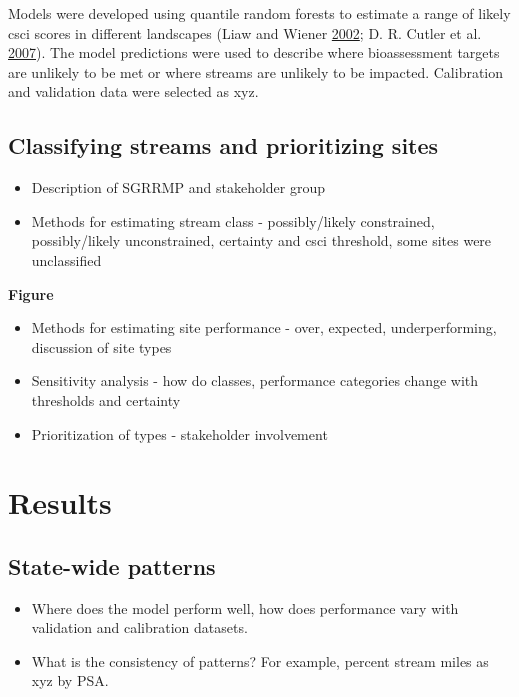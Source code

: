 \documentclass[]{article}
\begin{document}
Models were developed using quantile random forests to estimate a range
of likely \ac{csci} scores in different landscapes (Liaw and Wiener
\protect\hyperlink{ref-Liaw02}{2002}; D. R. Cutler et al.
\protect\hyperlink{ref-Cutler07}{2007}). The model predictions were used
to describe where bioassessment targets are unlikely to be met or where
streams are unlikely to be impacted. Calibration and validation data
were selected as xyz.

\subsection{Classifying streams and prioritizing
sites}\label{classifying-streams-and-prioritizing-sites}

\begin{itemize}
\item
  Description of SGRRMP and stakeholder group
\item
  Methods for estimating stream class - possibly/likely constrained,
  possibly/likely unconstrained, certainty and \ac{csci} threshold, some
  sites were unclassified
\end{itemize}

\textbf{Figure}

\begin{itemize}
\item
  Methods for estimating site performance - over, expected,
  underperforming, discussion of site types
\item
  Sensitivity analysis - how do classes, performance categories change
  with thresholds and certainty
\item
  Prioritization of types - stakeholder involvement
\end{itemize}

\section{Results}\label{results}

\subsection{State-wide patterns}\label{state-wide-patterns}

\begin{itemize}
\item
  Where does the model perform well, how does performance vary with
  validation and calibration datasets.
\item
  What is the consistency of patterns? For example, percent stream miles
  as xyz by PSA.
\end{itemize}
\end{document}
